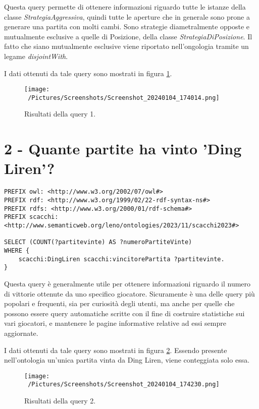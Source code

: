 \documentclass[12pt]{book}
\begin{document}
Questa query permette di ottenere informazioni riguardo tutte le
istanze della classe \textit{StrategiaAggressiva}, quindi tutte le
aperture che in generale sono prone a generare una partita con molti
cambi. Sono strategie diametralmente opposte e mutualmente esclusive a
quelle di Posizione, della classe \textit{StrategiaDiPosizione}. Il
fatto che siano mutualmente esclusive viene riportato nell'ongologia
tramite un legame \textit{disjointWith}.

I dati ottenuti da tale query sono mostrati in figura \ref{fig:query1}.

\begin{figure}[h]
  \caption{Risultati della query 1.}
  \centering
  \label{fig:query1}
  \texttt{[image: ~/Pictures/Screenshots/Screenshot\_20240104\_174014.png]}
\end{figure} 

\section{2 - Quante partite ha vinto 'Ding Liren'?}

\begin{verbatim}
PREFIX owl: <http://www.w3.org/2002/07/owl#>
PREFIX rdf: <http://www.w3.org/1999/02/22-rdf-syntax-ns#>
PREFIX rdfs: <http://www.w3.org/2000/01/rdf-schema#>
PREFIX scacchi: <http://www.semanticweb.org/leno/ontologies/2023/11/scacchi2023#>

SELECT (COUNT(?partitevinte) AS ?numeroPartiteVinte)
WHERE {
    scacchi:DingLiren scacchi:vincitorePartita ?partitevinte.
}
\end{verbatim}

Questa query è generalmente utile per ottenere informazioni riguardo
il numero di vittorie ottenute da uno specifico giocatore. Sicuramente
è una delle query più popolari e frequenti, sia per curiosità degli
utenti, ma anche per quelle che possono essere query automatiche
scritte con il fine di costruire statistiche sui vari giocatori, e
mantenere le pagine informative relative ad essi sempre aggiornate.

I dati ottenuti da tale query sono mostrati in figura \ref{fig:query2}.
Essendo presente nell'ontologia un'unica partita vinta da Ding Liren,
viene conteggiata solo essa.

\begin{figure}[h]
  \caption{Risultati della query 2.}
  \centering
  \label{fig:query2}
  \texttt{[image: ~/Pictures/Screenshots/Screenshot\_20240104\_174230.png]}
\end{figure} 
\end{document}
